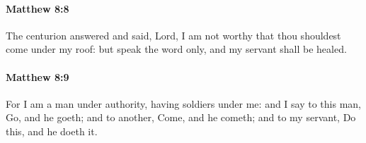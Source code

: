 		\paragraph{Matthew 8:8} %
			\label{MATTHEW-8-8}

			The centurion answered and said, Lord, I am not worthy that thou shouldest come under my roof: but speak the word only, and my servant shall be healed.

			\begin{framed}
			\scriptsize
				\begin{compactdesc}
					\item[SBLG] 
				\end{compactdesc}
			\end{framed}

		\paragraph{Matthew 8:9} %
			\label{MATTHEW-8-9}

			For I am a man under authority, having soldiers under me: and I say to this man, Go, and he goeth; and to another, Come, and he cometh; and to my servant, Do this, and he doeth it.

